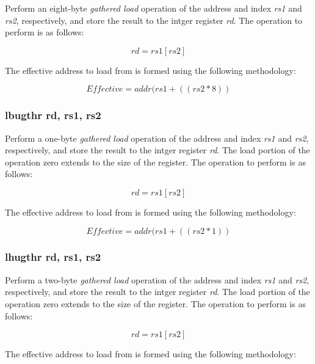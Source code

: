 \documentclass{article}
\begin{document}
Perform an eight-byte \emph{gathered load} operation of the address and
index \emph{rs1} and \emph{rs2}, respectively, and store the result
to the intger register \emph{rd}.  The operation to perform is as follows:

\begin{equation}
rd = rs1[rs2]
\end{equation}

The effective address to load
from is formed using the following methodology:

\begin{equation}
Effective = addr(rs1 + ((rs2 * 8))
\end{equation}

\subsubsection{lbugthr rd, rs1, rs2}

Perform a one-byte \emph{gathered load} operation of the address and
index \emph{rs1} and \emph{rs2}, respectively, and store the result
to the intger register \emph{rd}.  The load portion of the operation
zero extends to the size of the register.
The operation to perform is as follows:

\begin{equation}
rd = rs1[rs2]
\end{equation}

The effective address to load
from is formed using the following methodology:

\begin{equation}
Effective = addr(rs1 + ((rs2 * 1))
\end{equation}

\subsubsection{lhugthr rd, rs1, rs2}

Perform a two-byte \emph{gathered load} operation of the address and
index \emph{rs1} and \emph{rs2}, respectively, and store the result
to the intger register \emph{rd}.  The load portion of the operation
zero extends to the size of the register.
The operation to perform is as follows:

\begin{equation}
rd = rs1[rs2]
\end{equation}

The effective address to load
from is formed using the following methodology:
\end{document}
